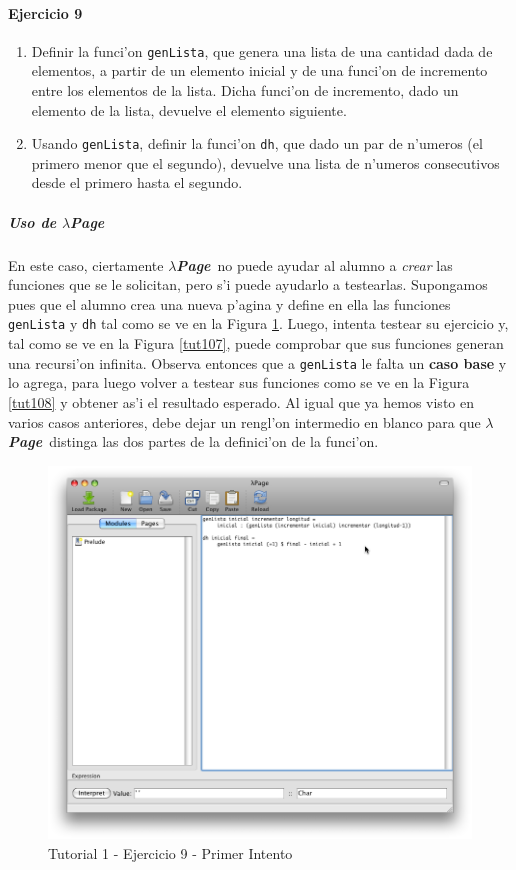 \documentclass[a4paper]{article}
\newcommand{\hpage}{\textbf{\textsl{$\lambda$Page}}}
\begin{document}
\paragraph{Ejercicio 9}
\renewcommand{\theenumi}{\Roman{enumi}}
\begin{enumerate}
	\item Definir la funci'on \texttt{genLista}, que genera una lista de una cantidad dada de elementos, a partir de un elemento inicial y de una funci'on de incremento entre los elementos de la lista.  Dicha funci'on de incremento, dado un elemento de la lista, devuelve el elemento siguiente.
	\item Usando \texttt{genLista}, definir la funci'on \texttt{dh}, que dado un par de n'umeros (el primero menor que el segundo), devuelve una lista de n'umeros consecutivos desde el primero hasta el segundo.
\end{enumerate}
\renewcommand{\theenumi}{\arabic{enumi}}
\subparagraph{Uso de \hpage}En este caso, ciertamente \hpage\ no puede ayudar al alumno a \textsl{crear} las funciones que se le solicitan, pero s'i puede ayudarlo a testearlas.  Supongamos pues que el alumno crea una nueva p'agina y define en ella las funciones \texttt{genLista} y \texttt{dh} tal como se ve en la Figura \ref{tut106}.  Luego, intenta testear su ejercicio y, tal como se ve en la Figura \ref{tut107}, puede comprobar que sus funciones generan una recursi'on infinita.  Observa entonces que a \texttt{genLista} le falta un \textbf{caso base} y lo agrega, para luego volver a testear sus funciones como se ve en la Figura \ref{tut108} y obtener as'i el resultado esperado.  Al igual que ya hemos visto en varios casos anteriores, debe dejar un rengl'on intermedio en blanco para que \hpage\ distinga las dos partes de la definici'on de la funci'on.
\begin{figure}[hp]
	\begin{center}
        	\includegraphics[width=.75\textwidth]{pictures/tut1/06}
		\caption{Tutorial 1 - Ejercicio 9 - Primer Intento}
		\label{tut106}
	\end{center}
\end{figure}
\end{document}
